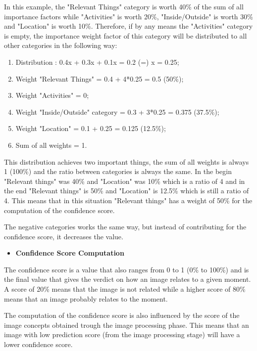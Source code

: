    In this example, the "Relevant Things" category is worth 40\% of the sum of all importance factors while "Activities" is worth 20\%, "Inside/Outside" is worth 30\% and "Location" is worth 10\%. Therefore, if by any means the "Activities" category is empty, the importance weight factor of this category will be distributed to all other categories in the following way:

   \begin{enumerate}
    \item Distribution : 0.4x + 0.3x + 0.1x = 0.2 (=) x = 0.25;
    \item Weight "Relevant Things" = 0.4 + 4*0.25 = 0.5 (50\%);
    \item Weight "Activities" = 0;
    \item Weight "Inside/Outside" category = 0.3 + 3*0.25 = 0.375 (37.5\%);
    \item Weight "Location" =  0.1 + 0.25 = 0.125 (12.5\%);
    \item Sum of all weights = 1.
   \end{enumerate}


   This distribution achieves two important things, the sum of all weights is always 1 (100\%) and the ratio between categories is always the same. In the begin "Relevant things" was 40\% and "Location" was 10\%  which is a ratio of 4 and in the end "Relevant things" is 50\% and "Location" is 12.5\% which is still a ratio of 4. This means that in this situation "Relevant things" has a weight of 50\% for the computation of the confidence score.
   
   The negative categories works the same way, but instead of contributing for the confidence score, it decreases the value.

    

    \begin{itemize}
      \item \textbf{Confidence Score Computation}
    \end{itemize}

    The confidence score is a value that also ranges from 0 to 1 (0\% to 100\%) and is the final value that gives the verdict on how an image relates to a given moment. A score of 20\% means that the image is not related while a higher score of 80\% means that an image probably relates to the moment. 

    The computation of the confidence score is also influenced by the score of the image concepts obtained trough the image processing phase. This means that an image with low prediction score (from the image processing stage) will have a lower confidence score. 

